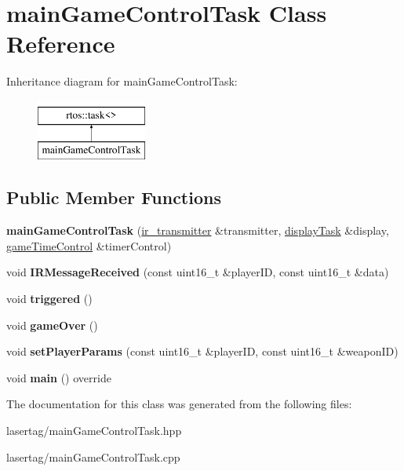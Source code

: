 \hypertarget{classmain_game_control_task}{}\section{main\+Game\+Control\+Task Class Reference}
\label{classmain_game_control_task}
Inheritance diagram for main\+Game\+Control\+Task\+:\begin{figure}[H]
\begin{center}
\leavevmode
\includegraphics[height=2.000000cm]{classmain_game_control_task}
\end{center}
\end{figure}
\subsection*{Public Member Functions}
\begin{DoxyCompactItemize}
\item 
\mbox{\label{classmain_game_control_task_a10dbf4428881f22899e385bd1f74991b}} 
{\bfseries main\+Game\+Control\+Task} (\mbox{\hyperlink{classir__transmitter}{ir\+\_\+transmitter}} \&transmitter, \mbox{\hyperlink{classdisplay_task}{display\+Task}} \&display, \mbox{\hyperlink{classgame_time_control}{game\+Time\+Control}} \&timer\+Control)
\item 
\mbox{\label{classmain_game_control_task_a727395509964e10edf5323d7192c761b}} 
void {\bfseries I\+R\+Message\+Received} (const uint16\+\_\+t \&player\+ID, const uint16\+\_\+t \&data)
\item 
\mbox{\label{classmain_game_control_task_a7a04d0258e87093610ac8c8a73fed802}} 
void {\bfseries triggered} ()
\item 
\mbox{\label{classmain_game_control_task_a9044decbe55b509dc4d131734c5cb2ca}} 
void {\bfseries game\+Over} ()
\item 
\mbox{\label{classmain_game_control_task_a727be41c2d7ae63c43f741cf59f8dcd3}} 
void {\bfseries set\+Player\+Params} (const uint16\+\_\+t \&player\+ID, const uint16\+\_\+t \&weapon\+ID)
\item 
\mbox{\label{classmain_game_control_task_a9c2aeb99699a44c9d7bdea6f6aecfb96}} 
void {\bfseries main} () override
\end{DoxyCompactItemize}


The documentation for this class was generated from the following files\+:\begin{DoxyCompactItemize}
\item 
lasertag/main\+Game\+Control\+Task.\+hpp\item 
lasertag/main\+Game\+Control\+Task.\+cpp\end{DoxyCompactItemize}
